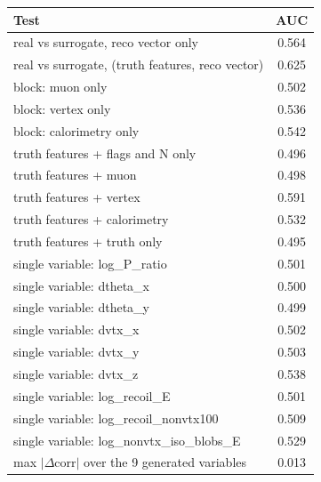 \begin{tabular}{lc}
\toprule
Test & AUC \\
\midrule
real vs surrogate, reco vector only & 0.564 \\
real vs surrogate, (truth features, reco vector) & 0.625 \\
\midrule
block: muon only & 0.502 \\
block: vertex only & 0.536 \\
block: calorimetry only & 0.542 \\
truth features + flags and N only & 0.496 \\
truth features + muon & 0.498 \\
truth features + vertex & 0.591 \\
truth features + calorimetry & 0.532 \\
truth features + truth only & 0.495 \\
single variable: log\_P\_ratio & 0.501 \\
single variable: dtheta\_x & 0.500 \\
single variable: dtheta\_y & 0.499 \\
single variable: dvtx\_x & 0.502 \\
single variable: dvtx\_y & 0.503 \\
single variable: dvtx\_z & 0.538 \\
single variable: log\_recoil\_E & 0.501 \\
single variable: log\_recoil\_nonvtx100 & 0.509 \\
single variable: log\_nonvtx\_iso\_blobs\_E & 0.529 \\
\midrule
max $|\Delta$corr$|$ over the 9 generated variables & 0.013 \\
\bottomrule
\end{tabular}
